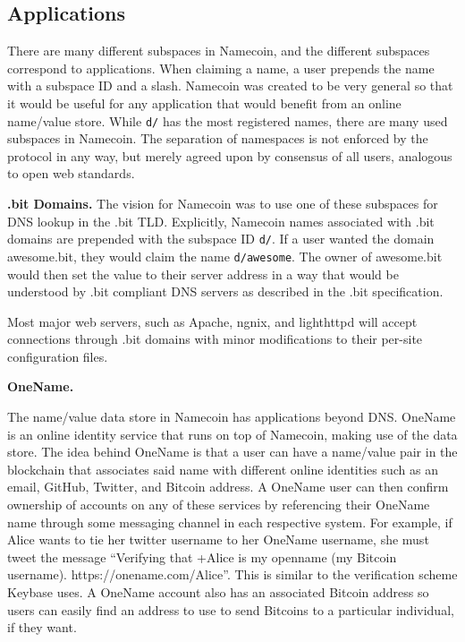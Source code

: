 \subsection{Applications}

There are many different subspaces in Namecoin, and the different subspaces correspond to applications. When claiming a name, a user prepends the name with a subspace ID and a slash. Namecoin was created to be very general so that it would be useful for any application that would benefit from an online name/value store. While {\tt d/} has the most registered names, there are many used subspaces in Namecoin. The separation of namespaces is not enforced by the protocol in any way, but merely agreed upon by consensus of all users, analogous to open web standards.

{\bf .bit Domains.}
The vision for Namecoin was to use one of these subspaces for DNS lookup in the .bit TLD. Explicitly, Namecoin names associated with .bit domains are prepended with the subspace ID {\tt d/}. If a user wanted the domain awesome.bit, they would claim the name {\tt d/awesome}. The owner of awesome.bit would then set the value to their server address in a way that would be understood by .bit compliant DNS servers as described in the .bit specification\cite{bitdnsspec}.

Most major web servers, such as Apache, ngnix, and lighthttpd will accept connections through .bit domains with minor modifications to their per-site configuration files.

{\bf OneName.}

The name/value data store in Namecoin has applications beyond DNS. OneName is an online identity service that runs on top of Namecoin, making use of the data store. The idea behind OneName is that a user can have a name/value pair in the blockchain that associates said name with different online identities such as an email, GitHub, Twitter, and Bitcoin address. A OneName user can then confirm ownership of accounts on any of these services by referencing their OneName name through some messaging channel in each respective system. For example, if Alice wants to tie her twitter username to her OneName username, she must tweet the message ``Verifying that +Alice is my openname (my Bitcoin username). https://onename.com/Alice''. This is similar to the verification scheme Keybase uses. A OneName account also has an associated Bitcoin address so users can easily find an address to use to send Bitcoins to a particular individual, if they want.

